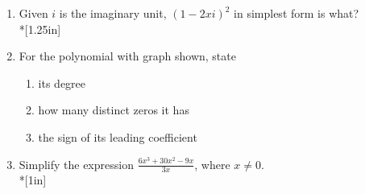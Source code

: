\documentclass[12pt, oneside]{article}
\begin{document}
\begin{enumerate}
\item Given $i$ is the imaginary unit, $(1-2xi)^2$ in simplest form is what?  \\*[1.25in]


\newpage

\item For the polynomial with graph shown, state 
\begin{enumerate}
\item its degree \\[0.25in]
\item how many distinct zeros it has \\[0.25in]
\item the sign of its leading coefficient \\[0.25in]
\end{enumerate}


\item Simplify the expression $\displaystyle \frac{6x^3+30x^2-9x}{3x}$, where $x \neq 0$.  \\*[1in]



\newpage


\end{enumerate}
\end{document}
